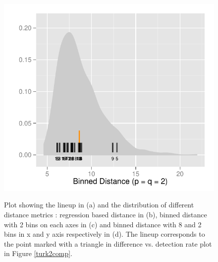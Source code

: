 \documentclass[12]{article}
\begin{document}
\begin{figure}[hbtp]
{\includegraphics[scale=0.55]{distribution-bin-dist-2-2-exp2.pdf}
\label{t2comp_2}
}
\label{turk2-exp}
	\vspace{-.1in}
\caption[Optional caption for list of figures]{Plot showing the lineup in (a) and the distribution of different distance metrics : regression based distance in (b), binned distance with 2 bins on each axes in (c) and binned distance with 8 and 2 bins in x and y axis respectively in (d). The lineup corresponds to the point marked with a triangle in difference vs. detection rate plot in Figure \ref{turk2comp}.}
\end{figure}
\end{document}
